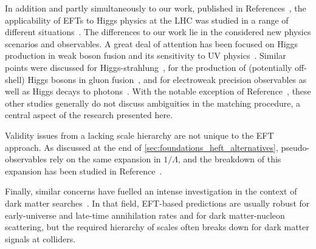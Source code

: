 
\newparagraph
%
In addition and partly simultaneously to our work, published in
References~\cite{Brehmer:2015rna, Biekotter:2016ecg}, the
applicability of EFTs to Higgs physics at the LHC was studied in a
range of different situations~\cite{Biekoetter:2014jwa,
  Arnesen:2008fb, Englert:2014cva, deVries:2014apa, Craig:2014una,
  Dawson:2015gka, Edezhath:2015lga, Gorbahn:2015gxa,
  Edelhaeuser:2015zra, Drozd:2015kva, Englert:2015hrx,
  Contino:2016jqw, Freitas:2016iwx, deFlorian:2016spz}. The
differences to our work lie in the considered new physics scenarios
and observables. A great deal of attention has been focused on Higgs
production in weak boson fusion and its sensitivity to UV
physics~\cite{Alwall:2007ed, Hagiwara:2009wt, Englert:2012xt,
  Brehmer:2014pka}. Similar points were discussed for
Higgs-strahlung~\cite{Biekoetter:2014jwa}, for the production of
(potentially off-shell) Higgs bosons in gluon
fusion~\cite{Azatov:2014jga, Buschmann:2014sia, Dawson:2015gka,
  Drozd:2015kva, Azatov:2016xik}, and for electroweak precision
observables as well as Higgs decays to
photons~\cite{Freitas:2016iwx}. With the notable exception of
Reference~\cite{Freitas:2016iwx}, these other studies generally do not
discuss ambiguities in the matching procedure, a central aspect of the
research presented here.

Validity issues from a lacking scale hierarchy are not unique to the
EFT approach. As discussed at the end of
\autoref{sec:foundations_heft_alternatives}, pseudo-observables rely
on the same expansion in $1/\Lambda$, and the breakdown of this
expansion has been studied in Reference~\cite{Greljo:2015sla}.

Finally, similar concerns have fuelled an intense investigation in the
context of dark matter searches~\cite{Shoemaker:2011vi,
  Busoni:2013lha, Buchmueller:2013dya, Busoni:2014sya, Racco:2015dxa,
  Bauer:2016pug}.  In that field, EFT-based predictions are usually
robust for early-universe and late-time annihilation rates and for
dark matter-nucleon scattering, but the required hierarchy of scales
often breaks down for dark matter signals at colliders.



